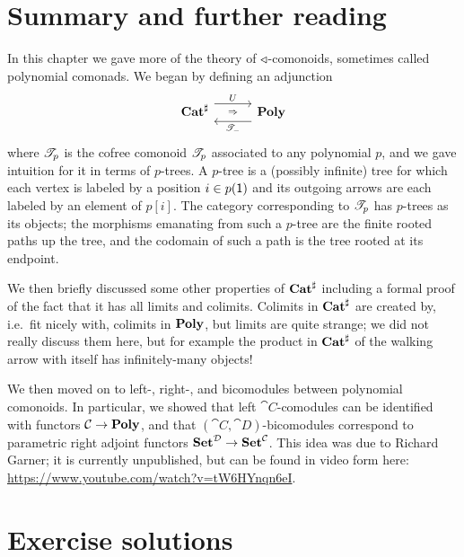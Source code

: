 \documentclass[Book-Poly]{subfiles}
\begin{document}
\section{Summary and further reading}

In this chapter we gave more of the theory of $\mathbin{\triangleleft}$-comonoids, sometimes called polynomial comonads. We began by defining an adjunction
\[
\adj{\smcat^\sharp}{U}{\cofree{-}}{\poly}
\]
where $\mathscr{T}_{p}$ is the cofree comonoid $\mathscr{T}_{p}$ associated to any polynomial $p$, and we gave intuition for it in terms of $p$-trees. A $p$-tree is a (possibly infinite) tree for which each vertex is labeled by a position $i\in p(\textsf{1})$ and its outgoing arrows are each labeled by an element of $p[i]$. The category corresponding to $\mathscr{T}_{p}$ has $p$-trees as its objects; the morphisms emanating from such a $p$-tree are the finite rooted paths up the tree, and the codomain of such a path is the tree rooted at its endpoint.

We then briefly discussed some other properties of $\mathbf{Cat}^\sharp$ including a formal proof of the fact that it has all limits and colimits. Colimits in $\mathbf{Cat}^\sharp$ are created by, i.e.\ fit nicely with, colimits in $\mathbf{Poly}$, but limits are quite strange; we did not really discuss them here, but for example the product in $\mathbf{Cat}^\sharp$ of the walking arrow \fbox{$\bullet\to\bullet$} with itself has infinitely-many objects! 

We then moved on to left-, right-, and bicomodules between polynomial comonoids. In particular, we showed that left $\cat{C}$-comodules can be identified with functors $\mathcal{C}\to\mathbf{Poly}$, and that $(\cat{C},\cat{D})$-bicomodules correspond to parametric right adjoint functors $\mathbf{Set}^{\mathcal{D}}\to\mathbf{Set}^{\mathcal{C}}$. This idea was due to Richard Garner; it is currently unpublished, but can be found in video form here: \url{https://www.youtube.com/watch?v=tW6HYnqn6eI}.



\section{Exercise solutions}
{\footnotesize
}
\end{document}

